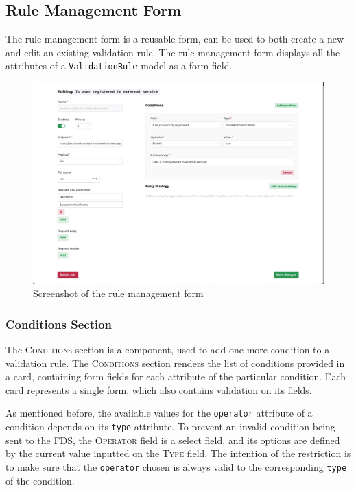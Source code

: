   \subsection{Rule Management Form}
  
    The rule management form is a reusable form, can be used to both create a new and edit an existing validation rule. The rule management form displays all the attributes of a \verb;ValidationRule; model as a form field. 

    \begin{figure}[!ht]
      \includegraphics[width=\textwidth]{images/ss_sample_filled.jpeg}
      \caption{Screenshot of the rule management form}
    \end{figure}

    \subsubsection{Conditions Section}

      The \textsc{Conditions} section is a component, used to add one more condition to a validation rule. The \textsc{Conditions} section renders the list of conditions provided in a card, containing form fields for each attribute of the particular condition. Each card represents a single form, which also contains validation on its fields. 
      
      As mentioned before, the available values for the \verb;operator; attribute of a condition depends on its \verb;type; attribute. To prevent an invalid condition being sent to the FDS, the \textsc{Operator} field is a select field, and its options are defined by the current value inputted on the \textsc{Type} field. The intention of the restriction is to make sure that the \verb;operator; chosen is always valid to the corresponding \verb;type; of the condition.

